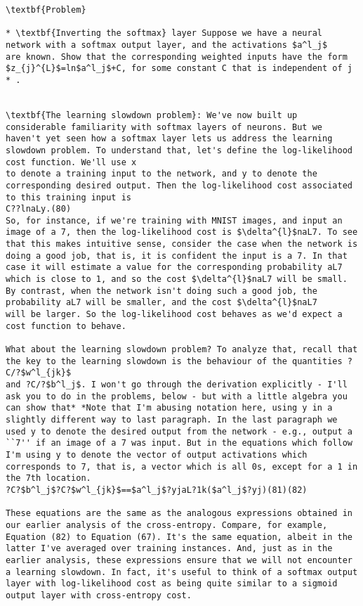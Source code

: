 \begin{lstlisting}
\textbf{Problem}

* \textbf{Inverting the softmax} layer Suppose we have a neural network with a softmax output layer, and the activations $a^l_j$
are known. Show that the corresponding weighted inputs have the form $z_{j}^{L}$=ln$a^l_j$+C, for some constant C that is independent of j
* . 


\textbf{The learning slowdown problem}: We've now built up considerable familiarity with softmax layers of neurons. But we haven't yet seen how a softmax layer lets us address the learning slowdown problem. To understand that, let's define the log-likelihood cost function. We'll use x
to denote a training input to the network, and y to denote the corresponding desired output. Then the log-likelihood cost associated to this training input is 
C??lnaLy.(80)
So, for instance, if we're training with MNIST images, and input an image of a 7, then the log-likelihood cost is $\delta^{l}$naL7. To see that this makes intuitive sense, consider the case when the network is doing a good job, that is, it is confident the input is a 7. In that case it will estimate a value for the corresponding probability aL7 which is close to 1, and so the cost $\delta^{l}$naL7 will be small. By contrast, when the network isn't doing such a good job, the probability aL7 will be smaller, and the cost $\delta^{l}$naL7
will be larger. So the log-likelihood cost behaves as we'd expect a cost function to behave.

What about the learning slowdown problem? To analyze that, recall that the key to the learning slowdown is the behaviour of the quantities ?C/?$w^l_{jk}$
and ?C/?$b^l_j$. I won't go through the derivation explicitly - I'll ask you to do in the problems, below - but with a little algebra you can show that* *Note that I'm abusing notation here, using y in a slightly different way to last paragraph. In the last paragraph we used y to denote the desired output from the network - e.g., output a ``7'' if an image of a 7 was input. But in the equations which follow I'm using y to denote the vector of output activations which corresponds to 7, that is, a vector which is all 0s, except for a 1 in the 7th location. 
?C?$b^l_j$?C?$w^l_{jk}$==$a^l_j$?yjaL?1k($a^l_j$?yj)(81)(82)

These equations are the same as the analogous expressions obtained in our earlier analysis of the cross-entropy. Compare, for example, Equation (82) to Equation (67). It's the same equation, albeit in the latter I've averaged over training instances. And, just as in the earlier analysis, these expressions ensure that we will not encounter a learning slowdown. In fact, it's useful to think of a softmax output layer with log-likelihood cost as being quite similar to a sigmoid output layer with cross-entropy cost.


\end{lstlisting}
